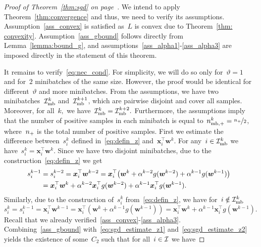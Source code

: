 \sgd*
\begin{proof}[Proof of Theorem~\ref{thm:sgd} on page~\pageref{thm:sgd}]
  We intend to apply Theorem~\ref{thm:convergence} and thus, we need to verify its assumptions. Assumption~\ref{ass_convex} is satisfied as~$L$ is convex due to Theorem~\ref{thm: convexity}. Assumption~\ref{ass_gbound} follows directly from Lemma~\ref{lemma:bound_g}, and assumptions~\ref{ass_alpha1}-\ref{ass_alpha3} are imposed directly in the statement of this theorem.

  It remains to verify~\eqref{eq:nec_cond}. For simplicity, we will do so only for~$\vartheta = 1$ and for~$2$ minibatches of the same size. However, the proof would be identical for different~$\vartheta$ and more minibatches. From the assumptions, we have two minibatches~$\mathcal{I}_{\text{mb}}^k$ and~$\mathcal{I}_{\text{mb}}^{k+1}$, which are pairwise disjoint and cover all samples. Moreover, for all~$k,$ we have~$\mathcal{I}_{\text{mb}}^k = \mathcal{I}_{\text{mb}}^{k+2}.$ Furthermore, the assumptions imply that the number of positive samples in each minibatch is equal to~$n_{\text{mb},+}^k = \nicefrac{n_{+}}{2}$, where~$n_{+}$ is the total number of positive samples. First we estimate the difference between~$s_i^k$ defined in~\eqref{eq:defin_z} and~$\bm{x}_i^\top \bm{w}^k$. For any~$i \in \mathcal{I}_{\text{mb}}^k$ we have~$s_i^k = \bm{x}_i^\top \bm{w}^k.$ Since we have two disjoint minibatches, due to the construction~\eqref{eq:defin_z} we get
  \begin{equation}\label{eq:sgd_estimate_z1}
    \begin{aligned}
      s_i^{k-1}
        & = s_i^{k-2}
          = \bm{x}_i^\top \bm{w}^{k-2}
          = \bm{x}_i^\top \Brac{\bm{w}^k + \alpha^{k-2}g(\bm{w}^{k-2}) + \alpha^{k-1} g(\bm{w}^{k-1})} \\
        & = \bm{x}_i^\top \bm{w}^k + \alpha^{k-2}\bm{x}_i^\top g(\bm{w}^{k-2}) + \alpha^{k-1}\bm{x}_i^\top g(\bm{w}^{k-1}).
    \end{aligned}
  \end{equation}
  Similarly, due to the construction of~$s_i^k$ from~\eqref{eq:defin_z}, we have for~$i \notin \mathcal{I}_{\text{mb}}^k$
  \begin{equation}\label{eq:sgd_estimate_z2}
    s_i^k
    = s_i^{k-1}
    = \bm{x}_i^\top \bm{w}^{k-1}
    = \bm{x}_i^\top (\bm{w}^k+\alpha^{k-1}g(\bm{w}^{k-1}))
    = \bm{x}_i^\top \bm{w}^k + \alpha^{k-1}\bm{x}_i^\top g(\bm{w}^{k-1}).
  \end{equation}
  Recall that we already verified~\ref{ass_convex}-\ref{ass_alpha3}. Combining~\ref{ass_gbound} with~\eqref{eq:sgd_estimate_z1} and~\eqref{eq:sgd_estimate_z2} yields the existence of some~$C_2$ such that for all~$i \in \mathcal{I}$ we have

\end{proof}
